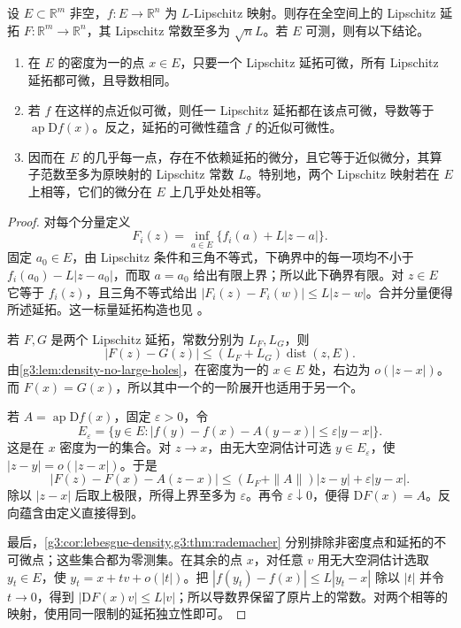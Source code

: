 \begin{proposition}\label{g3:prop:lipschitz-extension-density}
	设 \(E\subset\mathbb R^m\) 非空，\(f:E\to\mathbb R^n\) 为 \(L\)-Lipschitz 映射。则存在全空间上的 Lipschitz 延拓 \(F:\mathbb R^m\to\mathbb R^n\)，其 Lipschitz 常数至多为 \(\sqrt nL\)。若 \(E\) 可测，则有以下结论。
	\begin{enumerate}
		\item 在 \(E\) 的密度为一的点 \(x\in E\)，只要一个 Lipschitz 延拓可微，所有 Lipschitz 延拓都可微，且导数相同。
		\item 若 \(f\) 在这样的点近似可微，则任一 Lipschitz 延拓都在该点可微，导数等于 \(\operatorname{ap}\mathrm Df(x)\)。反之，延拓的可微性蕴含 \(f\) 的近似可微性。
		\item 因而在 \(E\) 的几乎每一点，存在不依赖延拓的微分，且它等于近似微分，其算子范数至多为原映射的 Lipschitz 常数 \(L\)。特别地，两个 Lipschitz 映射若在 \(E\) 上相等，它们的微分在 \(E\) 上几乎处处相等。
	\end{enumerate}
\end{proposition}
\begin{proof}
	对每个分量定义
	\[
		F_i(z)=\inf_{a\in E}\{f_i(a)+L|z-a|\}.
	\]
	固定 \(a_0\in E\)，由 Lipschitz 条件和三角不等式，下确界中的每一项均不小于 \(f_i(a_0)-L|z-a_0|\)，而取 \(a=a_0\) 给出有限上界；所以此下确界有限。对 \(z\in E\) 它等于 \(f_i(z)\)，且三角不等式给出 \(|F_i(z)-F_i(w)|\le L|z-w|\)。合并分量便得所述延拓。这一标量延拓构造也见 \cite[第5节，定理5.1，第29--30页]{Simon1983}。

	若 \(F,G\) 是两个 Lipschitz 延拓，常数分别为 \(L_F,L_G\)，则
	\[
		|F(z)-G(z)|\le(L_F+L_G)\operatorname{dist}(z,E).
	\]
	由\cref{g3:lem:density-no-large-holes}，在密度为一的 \(x\in E\) 处，右边为 \(o(|z-x|)\)。而 \(F(x)=G(x)\)，所以其中一个的一阶展开也适用于另一个。

	若 \(A=\operatorname{ap}\mathrm Df(x)\)，固定 \(\varepsilon>0\)，令
	\[
		E_\varepsilon=\{y\in E:
		 |f(y)-f(x)-A(y-x)|\le\varepsilon|y-x|\}.
	\]
	这是在 \(x\) 密度为一的集合。对 \(z\to x\)，由无大空洞估计可选 \(y\in E_\varepsilon\)，使 \(|z-y|=o(|z-x|)\)。于是
	\[
		|F(z)-F(x)-A(z-x)|
		\le(L_F+\|A\|)|z-y|+\varepsilon|y-x|.
	\]
	除以 \(|z-x|\) 后取上极限，所得上界至多为 \(\varepsilon\)。再令 \(\varepsilon\downarrow0\)，便得 \(\mathrm DF(x)=A\)。反向蕴含由定义直接得到。

	最后，\cref{g3:cor:lebesgue-density,g3:thm:rademacher} 分别排除非密度点和延拓的不可微点；这些集合都为零测集。在其余的点 \(x\)，对任意 \(v\) 用无大空洞估计选取 \(y_t\in E\)，使 \(y_t=x+tv+o(|t|)\)。把 \(|f(y_t)-f(x)|\le L|y_t-x|\) 除以 \(|t|\) 并令 \(t\to0\)，得到 \(|\mathrm DF(x)v|\le L|v|\)；所以导数界保留了原片上的常数。对两个相等的映射，使用同一限制的延拓独立性即可。
\end{proof}

